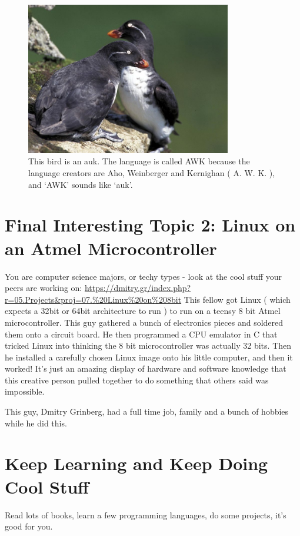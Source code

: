 \documentclass[10pt]{article}
\begin{document}
\begin{figure}[h]
  \centering
    \includegraphics[width=0.8\textwidth]{auk.jpg}
  \caption{This bird is an auk. The language is called AWK because the language creators are Aho,
Weinberger and Kernighan ( A. W. K. ), and `AWK' sounds like `auk'.}
\end{figure}



\section{Final Interesting Topic 2: Linux on an Atmel Microcontroller}
You are computer science majors, or techy types - look at the cool stuff your
peers are working on:
\url{https://dmitry.gr/index.php?r=05.Projects&proj=07.%20Linux%20on%208bit}
This fellow got Linux ( which expects a 32bit or 64bit architecture to run ) to
run on a teensy 8 bit Atmel microcontroller. This guy gathered a bunch of
electronics pieces and soldered them onto a circuit board. He then programmed a
CPU emulator in C that tricked Linux into thinking the 8 bit microcontroller 
was actually 32 bits. Then he installed a carefully chosen Linux image onto his
little computer, and then it worked! 
It's just an amazing display of hardware and software knowledge that this
creative person  pulled together to do something that others said was
impossible. 

This guy, Dmitry Grinberg, had a full time job, family and a bunch of hobbies
while he did this.

\section{Keep Learning and Keep Doing Cool Stuff}
Read lots of books, learn a few programming languages, do some projects, it's
good for you.
\end{document}
